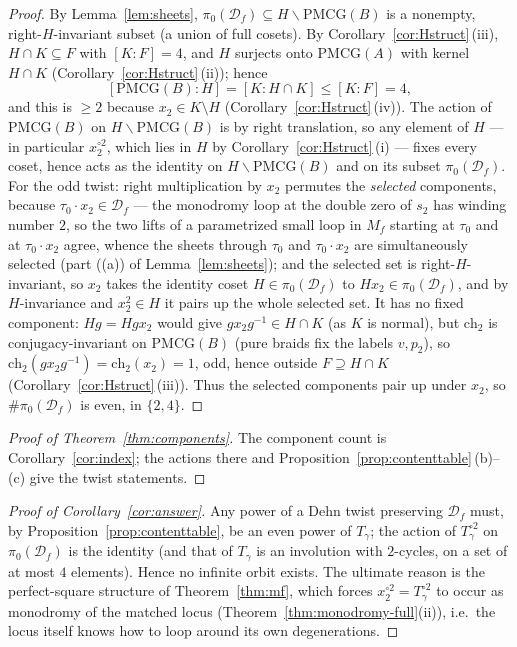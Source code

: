 \documentclass[11pt]{article}
\theoremstyle{definition}
\theoremstyle{remark}
\newcommand{\PMCG}{\mathrm{PMCG}}
\newcommand{\Df}{\mathcal D_f}
\begin{document}
\begin{proof}
By Lemma~\ref{lem:sheets}, $\pi_0(\Df)\subseteq H\backslash\PMCG(B)$
is a nonempty, right-$H$-invariant subset (a union of full cosets).
By Corollary~\ref{cor:Hstruct}\,(iii),
$H\cap K\subseteq F$ with $[K:F]=4$, and $H$ surjects onto
$\PMCG(A)$ with kernel $H\cap K$
\textup{(}Corollary~\ref{cor:Hstruct}\,(ii)\textup{)}; hence
\[
[\PMCG(B):H]=[K:H\cap K]\le [K:F]=4,
\]
and this is $\ge2$ because $x_2\in K\setminus H$
\textup{(}Corollary~\ref{cor:Hstruct}\,(iv)\textup{)}.  The action of
$\PMCG(B)$ on $H\backslash\PMCG(B)$ is by right translation, so any
element of $H$ — in particular $x_2^{\circ2}$, which lies in $H$ by
Corollary~\ref{cor:Hstruct}\,(i) — fixes every coset, hence acts as
the identity on $H\backslash\PMCG(B)$ and on its subset $\pi_0(\Df)$.
For the odd twist: right multiplication by $x_2$ permutes the
\emph{selected} components, because $\tau_0\cdot x_2\in\Df$ — the
monodromy loop at the double zero of $s_2$ has winding number $2$, so
the two lifts of a parametrized small loop in $M_f$ starting at
$\tau_0$ and at $\tau_0\cdot x_2$ agree, whence the sheets through
$\tau_0$ and $\tau_0\cdot x_2$ are simultaneously selected
\textup{(}part \textup{(}(a)\textup{)} of
Lemma~\ref{lem:sheets}\textup{)}; and the selected set is
right-$H$-invariant, so $x_2$ takes the identity coset $H\in\pi_0(\Df)$
to $Hx_2\in\pi_0(\Df)$, and by $H$-invariance and
$x_2^2\in H$ it pairs up the whole selected set.  It has no fixed
component: $Hg=Hgx_2$ would give $gx_2g^{-1}\in H\cap K$
\textup{(}as $K$ is normal\textup{)}, but $\mathrm{ch}_2$ is
conjugacy-invariant on $\PMCG(B)$ \textup{(}pure braids fix the labels
$v,p_2$\textup{)}, so
$\mathrm{ch}_2(gx_2g^{-1})=\mathrm{ch}_2(x_2)=1$, odd, hence outside
$F\supseteq H\cap K$ \textup{(}Corollary~\ref{cor:Hstruct}\,(iii)\textup{)}.
Thus the selected components pair up under $x_2$, so
$\#\pi_0(\Df)$ is even, in $\{2,4\}$.
\end{proof}

\begin{proof}[Proof of Theorem~\ref{thm:components}]
The component count is Corollary~\ref{cor:index}; the actions there and
Proposition~\ref{prop:contenttable}\,(b)–(c) give the twist statements.
\end{proof}

\begin{proof}[Proof of Corollary~\ref{cor:answer}]
Any power of a Dehn twist preserving $\Df$ must, by
Proposition~\ref{prop:contenttable}, be an even power of $T_\gamma$;
the action of $T_\gamma^{\circ2}$ on $\pi_0(\Df)$ is the identity
\textup{(}and that of $T_\gamma$ is an involution with $2$-cycles,
on a set of at most $4$ elements\textup{)}.  Hence no infinite orbit
exists.  The
ultimate reason is the perfect-square structure of
Theorem~\ref{thm:mf}, which forces $x_2^{\circ2}=T_\gamma^{\circ2}$ to
occur as monodromy of the matched locus (Theorem~\ref{thm:monodromy-full}(ii)),
i.e.\ the locus itself knows how to loop around its own
degenerations.
\end{proof}

\end{document}
